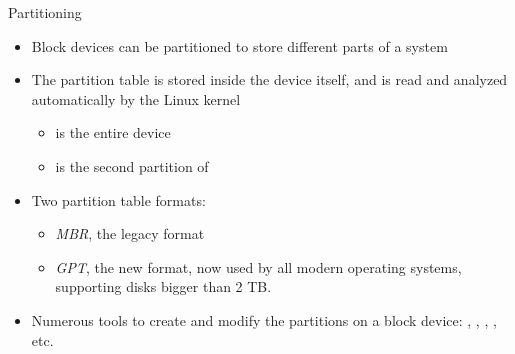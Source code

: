 \begin{frame}{Partitioning}
  \begin{itemize}
  \item Block devices can be partitioned to store different parts of a
    system
  \item The partition table is stored inside the device itself, and is
    read and analyzed automatically by the Linux kernel
    \begin{itemize}
    \item {} is the entire device
    \item {} is the second partition of 
    \end{itemize}
  \item Two partition table formats:
    \begin{itemize}
    \item {\em MBR}, the legacy format
    \item {\em GPT}, the new format, now used by all modern operating
          systems, supporting disks bigger than 2 TB.
    \end{itemize}
  \item Numerous tools to create and modify the partitions on a block
    device: , , , ,
    etc.
  \end{itemize}
\end{frame}

